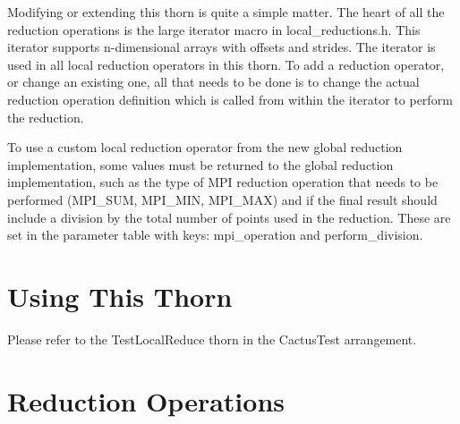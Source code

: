 Modifying or extending this thorn is quite a simple matter.  The heart
of all the reduction operations is the large iterator macro in
local\_reductions.h.  This iterator supports n-dimensional arrays with
offsets and strides.  The iterator is used in all local reduction
operators in this thorn.  To add a reduction operator, or change an
existing one, all that needs to be done is to change the actual
reduction operation definition which is called from within the
iterator to perform the reduction.

To use a custom local reduction operator from the new global reduction
implementation, some values must be returned to the global reduction
implementation, such as the type of MPI reduction operation that needs
to be performed (MPI\_SUM, MPI\_MIN, MPI\_MAX) and if the final result
should include a division by the total number of points used in the
reduction.  These are set in the parameter table with keys:
mpi\_operation and perform\_division.

\section{Using This Thorn}
Please refer to the TestLocalReduce thorn in the CactusTest
arrangement.

\section{Reduction Operations}

